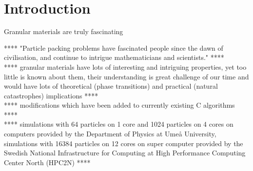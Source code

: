 \documentclass[class=report, float=false, crop=false]{standalone}
\begin{document}
\chapter*{Introduction}
\label{introduction}

Granular materials are truly fascinating 

**** "Particle packing problems have fascinated people since the dawn of civilisation, and continue to intrigue mathematicians and scientists." \cite{donev2004unusually} ****\\

**** granular materials have lots of interesting and intriguing properties, yet too little is known about them, their understanding is great challenge of our time and would have lots of theoretical (phase transitions) and practical (natural catastrophes) implications \cite{youtube4} ****\\

**** modifications which have been added to currently existing C algorithms ****\\

**** simulations with 64 particles on 1 core and 1024 particles on 4 cores on computers provided by the Department of Physics at Umeå University, simulations with 16384 particles on 12 cores on super computer provided by the Swedish National Infrastructure for Computing at High Performance Computing Center North (HPC2N) ****

% 
\end{document}
